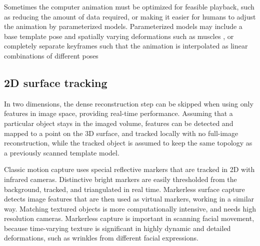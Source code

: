 Sometimes the computer animation must be optimized for feasible playback, such as reducing the amount of data required, or making it easier for humans to adjust the animation by parameterized models.
Parameterized models may include a base template pose and spatially varying deformations such as muscles \cite{waters1987muscle}, or completely separate keyframes such that the animation is interpolated as linear combinations of different poses \cite{deng2007computer,beeler2011high}


\subsection{2D surface tracking} %


In two dimensions, the dense reconstruction step can be skipped when using only features in image space, providing real-time performance. \cite{pilet2005real}
Assuming that a particular object stays in the imaged volume, features can be detected and mapped to a point on the 3D surface, and tracked locally with no full-image reconstruction, while the tracked object is assumed to keep the same topology as a previously scanned template model.


Classic motion capture uses special reflective markers that are tracked in 2D with infrared cameras.
Distinctive bright markers are easily thresholded from the background, tracked, and triangulated in real time.
Markerless surface capture detects image features that are then used as virtual markers, working in a similar way.
Matching textured objects is more computationally intensive, and needs high resolution cameras.
\cite{moeslund2001survey}
Markerless capture is important in scanning facial movement, because time-varying texture is significant in highly dynamic and detailed deformations, such as wrinkles from different facial expressions.
\cite{bradley2008markerless,beeler2011high,bradley2010high}

